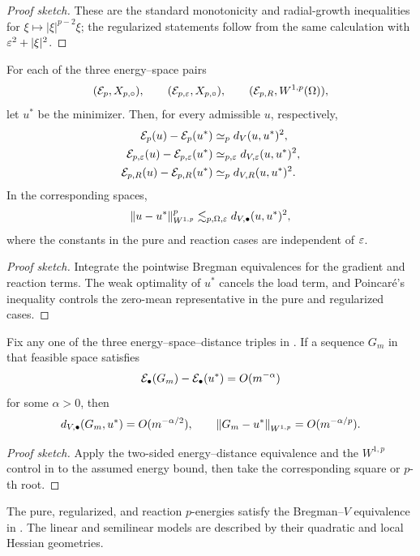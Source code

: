 \begin{proof}[Proof sketch]
These are the standard monotonicity and radial-growth inequalities for $\xi\mapsto|\xi|^{p-2}\xi$; the regularized statements follow from the same calculation with $\varepsilon^2+|\xi|^2$.
\end{proof}

\begin{theorem}
\label{thm:energy-v}
For each of the three energy--space pairs
\[
 (\mathcal{E}_p,X_{p,\circ}),\qquad(\mathcal{E}_{p,\varepsilon},X_{p,\circ}),\qquad
 (\mathcal{E}_{p,R},W^{1,p}(\Omega)),
\]
let \(u^*\) be the minimizer. Then, for every admissible \(u\), respectively,
\begin{align}
 \mathcal{E}_p(u)-\mathcal{E}_p(u^*)&\simeq_p d_V(u,u^*)^2,
 \label{eq:pure-equiv}\\
 \mathcal{E}_{p,\varepsilon}(u)-\mathcal{E}_{p,\varepsilon}(u^*)&\simeq_{p,\varepsilon}d_{V,\varepsilon}(u,u^*)^2,
 \label{eq:reg-equiv}\\
 \mathcal{E}_{p,R}(u)-\mathcal{E}_{p,R}(u^*)&\simeq_p d_{V,R}(u,u^*)^2.
 \label{eq:reaction-equiv}
\end{align}
In the corresponding spaces,
\begin{equation}
 \left\lVert u-u^*\right\rVert_{W^{1,p}}^p
 \lesssim_{p,\Omega,\varepsilon}d_{V,\bullet}(u,u^*)^2,
 \label{eq:w1p-control}
\end{equation}
where the constants in the pure and reaction cases are independent of \(\varepsilon\).
\end{theorem}

\begin{proof}[Proof sketch]
Integrate the pointwise Bregman equivalences for the gradient and reaction terms.  The weak optimality of $u^*$ cancels the load term, and Poincar\'e's inequality controls the zero-mean representative in the pure and regularized cases.
\end{proof}

\begin{corollary}
\label{cor:metric-rates}
Fix any one of the three energy--space--distance triples in . If a sequence
\(G_m\) in that feasible space satisfies
 \begin{equation}
 \mathcal{E}_\bullet(G_m)-\mathcal{E}_\bullet(u^*)=O(m^{-\alpha})
 \label{eq:assumed-energy-rate}
 \end{equation}
for some \(\alpha>0\), then
 \begin{equation}
 d_{V,\bullet}(G_m,u^*)=O(m^{-\alpha/2}),
 \qquad
 \left\lVert G_m-u^*\right\rVert_{W^{1,p}}=O(m^{-\alpha/p}).
\label{eq:metric-rates}
 \end{equation}
\end{corollary}

\begin{proof}[Proof sketch]
Apply the two-sided energy--distance equivalence and the $W^{1,p}$ control in  to the assumed energy bound, then take the corresponding square or $p$-th root.
\end{proof}

\begin{remark}
The pure, regularized, and reaction \(p\)-energies satisfy the Bregman--\(V\) equivalence in . The linear and semilinear models are described by their quadratic and local Hessian geometries.
\end{remark}

